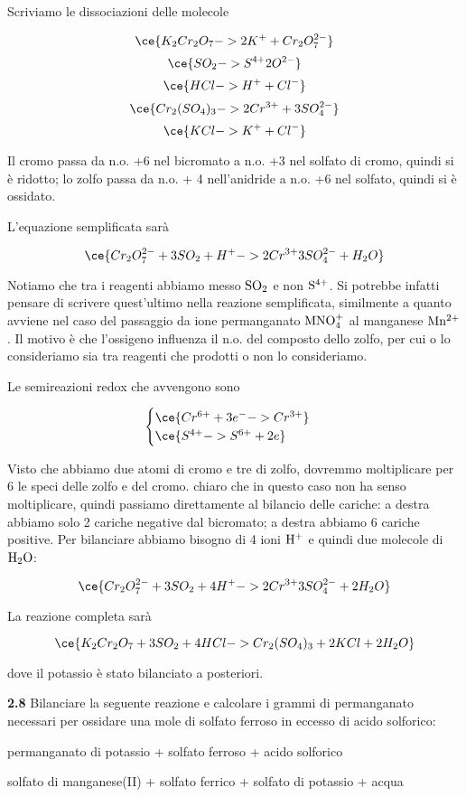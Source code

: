 Scriviamo le dissociazioni delle molecole

$$\ce{K_2Cr_2O_7 -> 2K^+ + Cr_2O_7^{2-}}$$
$$\ce{SO_2 -> S^{4+} 2O^{2-}}$$
$$\ce{HCl -> H^+ + Cl^-}$$
$$\ce{Cr_2(SO_4)_3 -> 2Cr^{3+} + 3SO_4^{2-}}$$
$$\ce{KCl -> K^+ + Cl^-}$$

Il cromo passa da n.o. +6 nel bicromato a n.o. +3 nel solfato di cromo, quindi si è ridotto; lo zolfo passa da n.o. + 4 nell'anidride a n.o. +6 nel solfato, quindi si è ossidato.

L'equazione semplificata sarà

$$\ce{Cr_2O_7^{2-} + 3SO_2 + H^+ -> 2Cr^{3+} 3SO_4^{2-} + H_2O}$$

Notiamo che tra i reagenti abbiamo messo $\rm SO_2$ e non $\rm S^{4+}$. Si potrebbe infatti pensare di scrivere quest'ultimo nella reazione semplificata, similmente a quanto avviene nel caso del passaggio da ione permanganato $\rm MNO_4^{+}$ al manganese $\rm Mn^{2+}$. Il motivo è che l'ossigeno influenza il n.o. del composto dello zolfo, per cui o lo consideriamo sia tra reagenti che prodotti o non lo consideriamo.

Le semireazioni redox che avvengono sono

$$\begin{cases}
    \ce{Cr^{6+} +3e^- -> Cr^{3+}}\\
    \ce{S^{4+} -> S^{6+} +2e}
\end{cases}$$

Visto che abbiamo due atomi di cromo e tre di zolfo, dovremmo moltiplicare per 6 le speci delle zolfo e del cromo. \E chiaro che in questo caso non ha senso moltiplicare, quindi passiamo direttamente al bilancio delle cariche: a destra abbiamo solo 2 cariche negative dal bicromato; a destra abbiamo 6 cariche positive. Per bilanciare abbiamo bisogno di 4 ioni $\rm H^+$ e quindi due molecole di $\rm H_2O$:

$$\ce{Cr_2O_7^{2-} + 3SO_2 + 4H^+ -> 2Cr^{3+} 3SO_4^{2-} + 2H_2O}$$

La reazione completa sarà

$$\ce{K_2Cr_2O_7 + 3SO_2 + 4HCl -> Cr_2(SO_4)_3 + 2KCl + 2H_2O}$$

dove il potassio è stato bilanciato a posteriori.

\vspace{0.2cm}\textbf{2.8} Bilanciare la seguente reazione e calcolare i grammi di permanganato necessari per ossidare una
mole di solfato ferroso in eccesso di acido solforico:

\begin{center}
permanganato di potassio + solfato ferroso + acido solforico \ce{->}

\ce{->}solfato di manganese(II) + solfato ferrico + solfato di potassio + acqua
\end{center}

